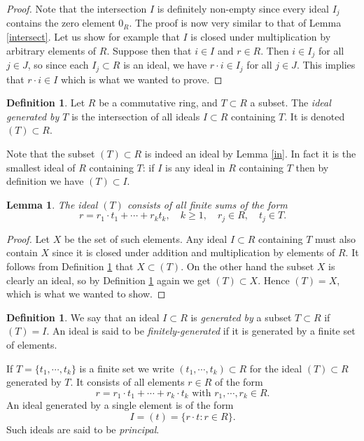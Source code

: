 \documentclass [12pt,oneside,a4paper,mathscr]{amsart}
\newtheorem{lemma}[thm]{Lemma}
\theoremstyle{definition}
\newtheorem{defn}[thm]{Definition}
\renewcommand{\geq}{\geqslant}
\begin{document}
\begin{proof}
 Note that the intersection $I$ is definitely non-empty since every ideal $I_j$ contains the zero element $0_R$. The proof is now very similar to that of Lemma \ref{intersect}. Let us show for example that $I$ is closed under multiplication by arbitrary elements of $R$. Suppose then that $i\in I$ and $r\in R$. Then $i\in I_j$ for all $j\in J$, so since each $I_j\subset R$ is an ideal, we have $r\cdot i\in I_j$ for all $j\in J$. This implies that  $r\cdot i\in I$ which is what we wanted to prove.
\end{proof}

\begin{defn}
\label{deff}Let $R$ be a commutative ring, and $T\subset R$ a subset. The \emph{ideal generated by $T$}  is the intersection of all ideals $I \subset R$ containing  $T$. It is denoted  $(T)\subset R$. 
\end{defn}

Note that the subset $(T)\subset R$ is indeed an ideal by Lemma \ref{in}. In fact it is the  smallest ideal of $R$ containing $T$: if $I$ is any ideal in $R$ containing $T$ then by definition we have $(T)\subset I$.


\begin{lemma}
The ideal $(T)$ consists of all
finite sums of the form
\[r=r_1\cdot t_1 + \cdots+ r_k t_k, \quad k\geq 1, \quad r_j \in R, \quad t_j \in T.\]
\end{lemma}

\begin{proof}
Let $X$ be the set of such elements.  Any ideal $I\subset R$ containing $T$ must also contain $X$ since it is closed under addition and multiplication by elements of $R$. It follows from Definition \ref{deff} that $X \subset (T)$. On the other hand the subset $X$ is clearly an ideal, so by Definition \ref{deff} again we get $(T)\subset X$. Hence $(T)=X$, which is what we wanted to show. 
\end{proof}

\begin{defn}We say that an ideal $I\subset R$ is \emph{generated by} a subset $T\subset R$ if $(T)=I$. An ideal is said to be \emph{finitely-generated} if it is generated by a finite set of elements.
\end{defn}

If $T=\{t_1,\cdots, t_k\}$ is a finite set we write
$(t_1,\cdots,t_k)\subset R$
for the ideal $(T)\subset R$ generated by $T$. It consists of all elements $r\in R$  of the form
\[r=r_1\cdot t_1 + \cdots + r_k \cdot t_k \text{ with } r_1,\cdots, r_k\in R.\]
An ideal generated by a single element is of the form
\[I=(t)=\{r\cdot t: r\in R\}.\]
 Such ideals are said to be \emph{principal}. 
\end{document}
